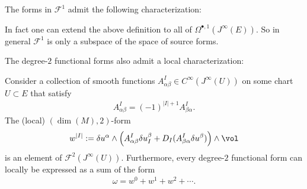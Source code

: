     The forms in $\mathcal{F}^1$ admit the following characterization:
    \begin{remark*}
        In fact one can extend the above definition to all of $\Omega^{\bullet,1}(J^\infty(E))$. So in general $\mathcal{F}^1$ is only a subspace of the space of source forms.
    \end{remark*}

    The degree-$2$ functional forms also admit a local characterization:
    \begin{property}
        Consider a collection of smooth functions $A^I_{\alpha\beta}\in C^\infty(J^\infty(U))$ on some chart $U\subset E$ that satisfy
        \begin{gather}
            A^I_{\alpha\beta} = (-1)^{|I|+1}A^I_{\beta\alpha}.
        \end{gather}
        The (local) $(\dim(M),2)$-form
        \begin{gather}
            w^{|I|} := \delta u^\alpha\wedge\left(A^I_{\alpha\beta}\delta u^\beta_I + D_I(A^I_{\beta\alpha}\delta u^\beta)\right)\wedge\vol
        \end{gather}
        is an element of $\mathcal{F}^2(J^\infty(U))$. Furthermore, every degree-$2$ functional form can locally be expressed as a sum of the form
        \begin{gather}
            \omega = w^0 + w^1 + w^2 + \cdots.
        \end{gather}
    \end{property}

